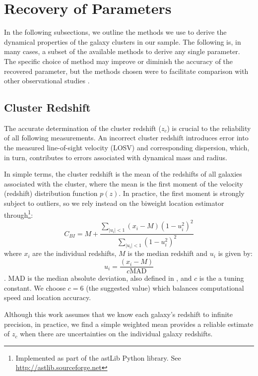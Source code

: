 \documentclass[fleqn,usenatbib]{mnras}
\begin{document}
\section{Recovery of Parameters}\label{sec:recovery}
In the following subsections, we outline the methods we use to derive the dynamical properties of the galaxy clusters in our sample. The following is, in many cases, a subset of the available methods to derive any single parameter. The specific choice of method may improve or diminish the accuracy of the recovered parameter, but the methods chosen were to facilitate comparison with other observational studies . 

\subsection{Cluster Redshift}
The accurate determination of the cluster redshift ($z_c$) is crucial to the reliability of all following measurements. An incorrect cluster redshift introduces error into the measured line-of-sight velocity (LOSV) and corresponding dispersion, which, in turn, contributes to errors associated with dynamical mass and radius. 

In simple terms, the cluster redshift is the mean of the redshifts of all galaxies associated with the cluster, where the mean is the first moment of the velocity (redshift) distribution function $p(z)$. In practice, the first moment is strongly subject to outliers, so we rely instead on the biweight location estimator \citep{Beers1990} through\footnote{Implemented as part of the {\sc astLib} Python library. See \hbox{\url{http://astlib.sourceforge.net}}}:
\begin{equation}
C_{BI} = M + \frac{\sum_{|u_i| < 1} (x_i - M)(1-u_i^2)^2}{\sum_{|u_i| < 1}(1-u_i^2)^2}
\end{equation}
where $x_i$ are the individual redshifts, $M$ is the median redshift and $u_i$ is given by:
\begin{equation}
	u_i = \frac{(x_i - M)}{c\mathrm{MAD}}
\end{equation}.
MAD is the median absolute deviation, also defined in \cite{Beers1990}, and $c$ is the a tuning constant. We choose $c=6$ (the suggested value) which balances computational speed and location accuracy. 

Although this work assumes that we know each galaxy's redshift to infinite precision, in practice, we find a simple weighted mean provides a reliable estimate of $z_c$ when there are uncertainties on the individual galaxy redshifts. 
\end{document}
